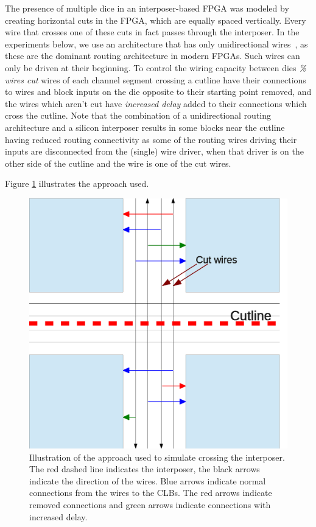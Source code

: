 \documentclass{sig-alternate-2013}
\begin{document}
The presence of multiple dice in an interposer-based FPGA was modeled by creating horizontal cuts in the FPGA, which are equally spaced vertically. Every wire that crosses one of these cuts in fact passes through the interposer. In the experiments below, we use an architecture that has only unidirectional wires~\cite{unidirectional}, as these are the dominant routing architecture in modern FPGAs. Such wires can only be driven at their beginning. To control the wiring capacity between dies \textit{\% wires cut} wires of each channel segment crossing a cutline have their connections to wires and block inputs on the die opposite to their starting point removed, and the wires which aren't cut have \textit{increased delay} added to their connections which cross the cutline. Note that the combination of a unidirectional routing architecture and a silicon interposer results in some blocks near the cutline having reduced routing connectivity as some of the routing wires driving their inputs are disconnected from the (single) wire driver, when that driver is on the other side of the cutline and the wire is one of the cut wires.

Figure \ref{fig:implementation} illustrates the approach used.

\begin{figure}[!htbp]
\centering
\includegraphics[width=\linewidth]{implementation.eps}
\caption{Illustration of the approach used to simulate crossing the interposer. The red dashed line indicates the interposer, the black arrows indicate the direction of the wires. Blue arrows indicate normal connections from the wires to the CLBs. The red arrows indicate removed connections and green arrows indicate connections with increased delay.}
\label{fig:implementation}
\end{figure}
\end{document}

